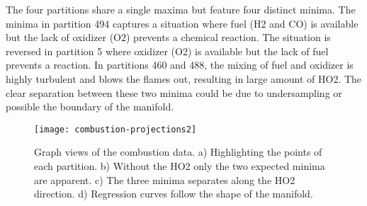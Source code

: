 The four partitions share a single maxima but feature four distinct minima. The minima in partition 494 captures a situation where fuel (H2 and CO) is available but the lack of oxidizer (O2) prevents a chemical reaction. The situation is reversed in partition 5 where oxidizer (O2) is available but the lack of fuel prevents a reaction. In partitions 460 and 488, the mixing of fuel and oxidizer is highly turbulent and blows the flames out, resulting in large amount of HO2. The clear separation between these two minima could be due to undersampling or possible the boundary of the manifold. 


\begin{figure}[tb]
    \begin{center}
     \texttt{[image: combustion-projections2]}
             \vspace{-.1in}
    \caption{Graph views of the combustion data. a) Highlighting the points of each partition. b) Without the HO2 only the two expected minima are apparent. c) The three minima separates along the HO2 direction. d) Regression curves follow the shape of the manifold.}
    \label{fig:combustion-projections}
         \vspace{-.1in}
         \end{center}
\end{figure}

